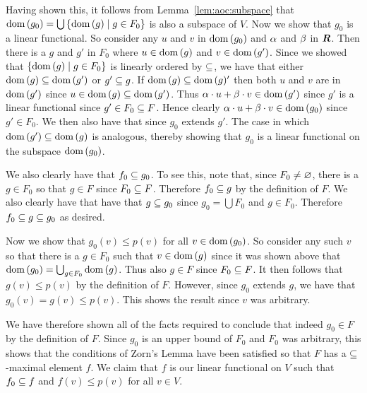 \begin{questions}
{{      Having shown this, it follows from Lemma~\ref{lem:aoc:subspace} that $\dom(g_0) = \bigcup \braces{\dom(g) \where g \in F_0}$ is also a subspace of $V$.
      Now we show that $g_0$ is a linear functional.
      So consider any $u$ and $v$ in $\dom(g_0)$ and $\a$ and $\b$ in $\reals$.
      Then there is a $g$ and $g'$ in $F_0$ where $u \in \dom(g)$ and $v \in \dom(g')$.
      Since we showed that $\braces{\dom(g) \where g \in F_0}$ is linearly ordered by $\ss$, we have that either $\dom(g) \ss \dom(g')$ or $g' \ss g$.
      If $\dom(g) \ss \dom(g)'$ then both $u$ and $v$ are in $\dom(g')$ since $u \in \dom(g) \ss \dom(g')$.
      Thus $\a \cdot u + \b \cdot v \in \dom(g')$ since $g'$ is a linear functional since $g' \in F_0 \ss F$.
      Hence clearly $\a \cdot u + \b \cdot v \in \dom(g_0)$ since $g' \in F_0$.
      We then also have that
      since $g_0$ extends $g'$.
      The case in which $\dom(g') \ss \dom(g)$ is analogous, thereby showing that $g_0$ is a linear functional on the subspace $\dom(g_0)$.

      We also clearly have that $f_0 \ss g_0$.
      To see this, note that, since $F_0 \neq \es$, there is a $g \in F_0$ so that $g \in F$ since $F_0 \ss F$.
      Therefore $f_0 \ss g$ by the definition of $F$.
      We also clearly have that have that $g \ss g_0$ since $g_0 = \bigcup F_0$ and $g \in F_0$.
      Therefore $f_0 \ss g \ss g_0$ as desired.

      Now we show that $g_0(v) \leq p(v)$ for all $v \in \dom(g_0)$.
      So consider any such $v$ so that there is a $g \in F_0$ such that $v \in \dom(g)$ since it was shown above that $\dom(g_0) = \bigcup_{g \in F_0} \dom(g)$.
      Thus also $g \in F$ since $F_0 \ss F$.
      It then follows that $g(v) \leq p(v)$ by the definition of $F$.
      However, since $g_0$ extends $g$, we have that $g_0(v) = g(v) \leq p(v)$.
      This shows the result since $v$ was arbitrary.

      We have therefore shown all of the facts required to conclude that indeed $g_0 \in F$ by the definition of $F$.
      Since $g_0$ is an upper bound of $F_0$ and $F_0$ was arbitrary, this shows that the conditions of Zorn's Lemma have been satisfied so that $F$ has a $\ss$-maximal element $f$.
      We claim that $f$ is our linear functional on $V$ such that $f_0 \ss f$ and $f(v) \leq p(v)$ for all $v \in V$.

}}
\end{questions}
